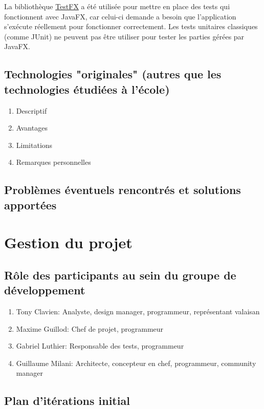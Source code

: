 \documentclass[a4paper,12pt]{article}
\begin{document}
	La bibliothèque \href{https://github.com/TestFX/TestFX}{TestFX} a été utilisée pour mettre en place des tests qui fonctionnent avec JavaFX, car celui-ci demande a besoin que l'application s'exécute réellement pour fonctionner correctement. Les tests unitaires classiques (comme JUnit) ne peuvent pas être utiliser pour tester les parties gérées par JavaFX.
	
	
	\subsection{Technologies "originales" (autres que les technologies étudiées à l'école)}
	\begin{enumerate}
		\item Descriptif
		\item Avantages
		\item Limitations
		\item Remarques personnelles
	\end{enumerate}
	
	\subsection{Problèmes éventuels rencontrés et solutions apportées}
	
	
	\section{Gestion du projet}
	
	
	\subsection{Rôle des participants au sein du groupe de développement}
	\begin{enumerate}
		\item Tony Clavien: Analyste, design manager, programmeur, représentant valaisan
		\item Maxime Guillod: Chef de projet, programmeur
		\item Gabriel Luthier: Responsable des tests, programmeur
		\item Guillaume Milani: Architecte, concepteur en chef, programmeur, community manager
	\end{enumerate}
	
	\subsection{Plan d'itérations initial}
	
\end{document}
